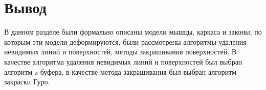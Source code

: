 
\section*{Вывод}

В данном разделе были формально описаны модели мышцы, каркаса и законы, по которым эти модели деформируются, были рассмотрены алгоритмы удаления невидимых линий и поверхностей, методы закрашивания поверхностей. В качестве алгоритма удаления невидимых линий и поверхностей был выбран алгоритм z-буфера, в качестве метода закрашивания был выбран алгоритм закраски Гуро.